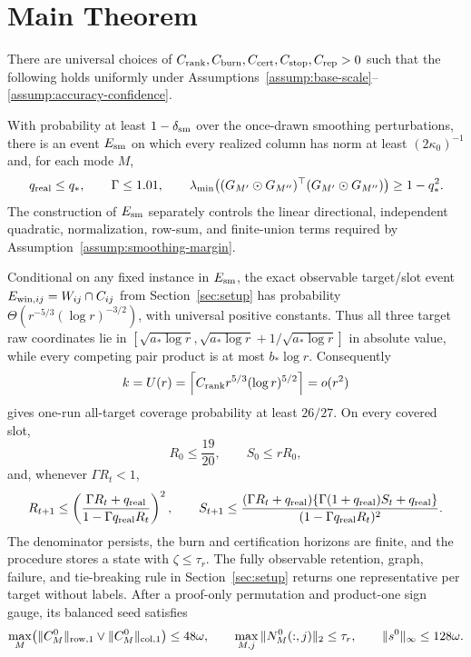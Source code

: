 \section{Main Theorem}\label{sec:main}

\begin{theorem}
\label{thm:main}
There are universal choices of
$C_{\rm rank},C_{\rm burn},C_{\rm cert},C_{\rm stop},C_{\rm rep}>0$ such
that the following holds uniformly under
Assumptions~\ref{assump:base-scale}--\ref{assump:accuracy-confidence}.

With probability at least $1-\delta_{\rm sm}$ over the once-drawn smoothing
perturbations, there is an event $E_{\rm sm}$ on which every realized column
has norm at least $(2\kappa _0)^{-1}$ and, for each mode $M$,
\[
 q_{\rm real}\le q_*,\qquad \Gamma\le1.01,\qquad
 \lambda_{\min}\!\left((G_{M'}\odot G_{M''})^\top
 (G_{M'}\odot G_{M''})\right)\ge1-q_*^2.
\]
The construction of $E_{\rm sm}$ separately controls the linear directional,
independent quadratic, normalization, row-sum, and finite-union terms required
by Assumption~\ref{assump:smoothing-margin}.

Conditional on any fixed instance in $E_{\rm sm}$, the exact observable
target/slot event $E_{{\rm win},ij}=W_{ij}\cap C_{ij}$ from
Section~\ref{sec:setup} has probability
$\Theta(r^{-5/3}(\log r)^{-3/2})$, with universal positive constants.
Thus all three target raw coordinates lie in
$[\sqrt{a_*\log r},\sqrt{a_*\log r}+1/\sqrt{a_*\log r}]$ in absolute
value, while every competing pair product is at most $b_*\log r$.
Consequently
\[
 k=U(r)=\left\lceil C_{\rm rank}r^{5/3}(\log r)^{5/2}\right\rceil=o(r^2)
\]
gives one-run all-target coverage probability at least $26/27$. On every
covered slot,
\[
 R_0\le\frac{19}{20},\qquad S_0\le rR_0,
\]
and, whenever $\Gamma R_t<1$,
\[
 R_{t+1}\le\left(\frac{\Gamma R_t+q_{\rm real}}
 {1-\Gamma q_{\rm real}R_t}\right)^2,\qquad
 S_{t+1}\le
 \frac{(\Gamma R_t+q_{\rm real})
 \{\Gamma(1+q_{\rm real})S_t+q_{\rm real}\}}
 {(1-\Gamma q_{\rm real}R_t)^2}.
\]
The denominator persists, the burn and certification horizons are finite,
and the procedure stores a state with $\zeta\le\tau_r$. The fully observable
retention, graph, failure, and tie-breaking rule in
Section~\ref{sec:setup} returns one representative per target without labels.
After a proof-only permutation and product-one sign gauge, its balanced seed
satisfies
\[
 \max_M\bigl(\|C_M^0\|_{\rm row,1}\vee\|C_M^0\|_{\rm col,1}\bigr)
 \le48\omega,\qquad
 \max_{M,j}\|N_M^0(:,j)\|_2\le\tau_r,\qquad
 \|s^0\|_\infty\le128\omega.
\]


\end{theorem}
